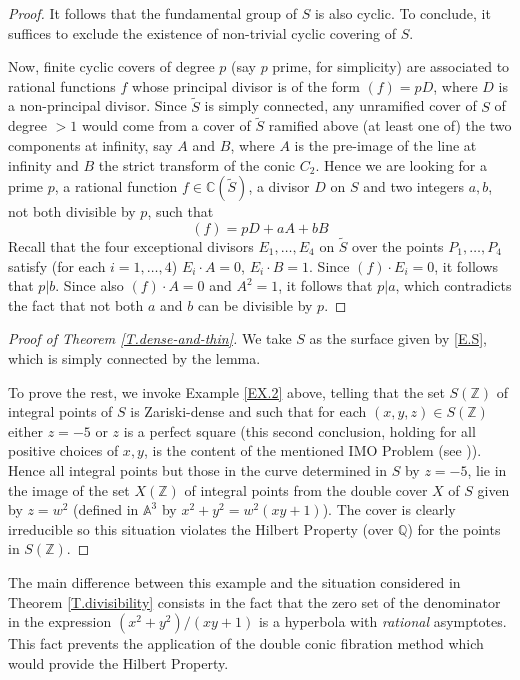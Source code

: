 \documentclass[leqno,12pt]{article} %
\def\A{{{\mathbb A}}}
\def\Z{{{\mathbb Z}}}
\def\Q{{{\mathbb Q}}}
\def\C{{{\mathbb C}}}
\theoremstyle{plain} %
\theoremstyle{definition} %
\begin{document}
\begin{proof}
It follows that the fundamental group of $S$ is also cyclic. To conclude, it suffices to exclude the existence of non-trivial cyclic covering of $S$.

 Now, finite cyclic covers of degree $p$ (say $p$ prime, for simplicity) are associated to rational functions $f$ whose principal  divisor  is of the form $(f)=pD$, where $D$ is a non-principal  divisor.  Since $\tilde{S}$ is simply connected, any unramified cover of $S$   of degree $>1$ would come from a cover of $\tilde{S}$ ramified   above (at least one of)  the two components at infinity, say $A$ and $B$, where $A$ is the pre-image of the line at infinity and $B$ the strict transform of the conic $C_2$. Hence we are looking for a prime $p$, a rational function $f\in \C(\tilde{S})$, a divisor $D$ on $S$ and two integers $a,b$, not both divisible by $p$, such that
\begin{equation*}
(f)=pD+aA+bB
\end{equation*}
Recall that the four exceptional divisors $E_1,\ldots,E_4$ on $\tilde{S}$   over the points $P_1,\ldots,P_4$ satisfy (for each $i=1,\ldots,4$) $E_i\cdot A=0$, $E_i\cdot B=1$. Since $(f)\cdot E_i=0$, it follows that $p|b$. Since also $(f)\cdot A=0$ and $A^2=1$, it follows that $p|a$, which contradicts the fact that not both $a$ and $b$ can be divisible by $p$.

\end{proof}
\medskip

\begin{proof}[Proof of Theorem \ref{T.dense-and-thin}]  We take $S$ as the surface  given by \eqref{E.S},  which  is simply connected by the lemma. 

To prove the rest, we invoke   Example \ref{EX.2} above, telling  that the set $S(\Z)$ of  integral points  of $S$ is  Zariski-dense and such that  for each $(x,y,z)\in S(\Z)$ either $z=-5$ or  $z$ is  a perfect square (this second conclusion, holding for all positive choices  of $x,y$, is the content of the mentioned IMO Problem (see \cite {DJMP})). Hence all   integral points but those in the    curve  determined in $S$ by $z=-5$,  lie in the image of the set $X(\Z)$ of integral points from  the double cover $X$ of $S$ given by $z=w^2$ (defined in $\A^3$ by $x^2+y^2=w^2(xy+1)$).
The cover is clearly irreducible so this situation violates the Hilbert Property (over $\Q$)  for the points in $S(\Z)$. 
  \end{proof}
 
The main difference between this example and the situation considered in Theorem \ref{T.divisibility} consists in the fact that the zero set of the denominator in the expression $(x^2+y^2)/(xy+1)$ is a hyperbola with {\it rational} asymptotes.  This fact prevents the application of the double conic fibration method  which would provide the Hilbert Property. 
\end{document}
